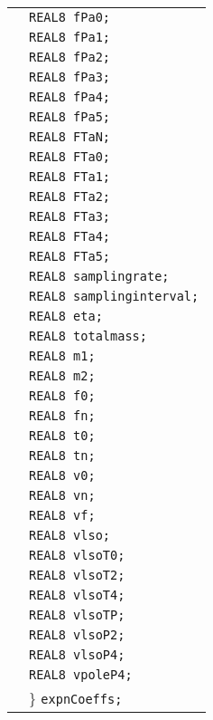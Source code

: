 \documentclass[12pt]{article}
\begin{document}
\begin{tabular}{ll}
                        & \texttt{REAL8 fPa0;}  \\
                        & \texttt{REAL8 fPa1;}  \\
                        & \texttt{REAL8 fPa2;}  \\
                        & \texttt{REAL8 fPa3;}  \\
                        & \texttt{REAL8 fPa4;}  \\
                        & \texttt{REAL8 fPa5;}  \\
                        & \texttt{REAL8 FTaN;}  \\
                        & \texttt{REAL8 FTa0;}  \\                       
			& \texttt{REAL8 FTa1;}  \\
                        & \texttt{REAL8 FTa2;}  \\
                        & \texttt{REAL8 FTa3;}  \\
                        & \texttt{REAL8 FTa4;}  \\
                        & \texttt{REAL8 FTa5;}  \\
                        & \texttt{REAL8 samplingrate;}  \\
                        & \texttt{REAL8 samplinginterval;}  \\
                        & \texttt{REAL8 eta;}  \\
                        & \texttt{REAL8 totalmass;}  \\
                        & \texttt{REAL8 m1;}  \\
                        & \texttt{REAL8 m2;}  \\
                        & \texttt{REAL8 f0;}  \\
                        & \texttt{REAL8 fn;}  \\                       
			& \texttt{REAL8 t0;}  \\
                        & \texttt{REAL8 tn;}  \\
                        & \texttt{REAL8 v0;}  \\
                        & \texttt{REAL8 vn;}  \\
                        & \texttt{REAL8 vf;}  \\

                        & \texttt{REAL8 vlso;}  \\
                        & \texttt{REAL8 vlsoT0;}  \\
                        & \texttt{REAL8 vlsoT2;}  \\
                        & \texttt{REAL8 vlsoT4;}  \\
                        & \texttt{REAL8 vlsoTP;}  \\
                        & \texttt{REAL8 vlsoP2;}  \\
                        & \texttt{REAL8 vlsoP4;}  \\
                        & \texttt{REAL8 vpoleP4;}  \\                       
                        & \} \texttt{expnCoeffs;}
\end{tabular}
\end{document}
